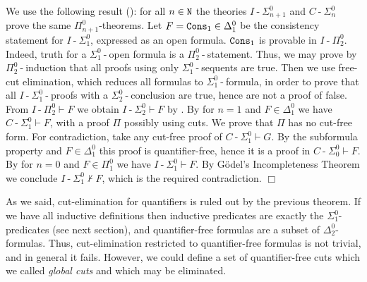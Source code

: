\documentclass[a4paper,12pt]{article}
\newenvironment{proof}[1][Proof]{\begin{trivlist}
\item[\hskip \labelsep {\bfseries #1}]}{\end{trivlist}}
\newcommand{\Nat}               { {\tt N}  }
\newcommand{\Cons}            { {\tt Cons} }
\newcommand{\hy}        { {\operatorname{-}}}
\begin{document}
\begin{proof}
We use the following result (\cite{Anupam}): for all $n \in \Nat$ the theories $I\hy \Sigma^0_{n+1}$ and $C\hy \Sigma^0_{n}$ prove the same $\Pi^0_{n+1}$-theorems. Let $F = \Cons_1 \in \Delta^0_1$ be the consistency statement for  $I\hy \Sigma^0_1$, expressed as an open formula. $\Cons_1$ is provable in $I\hy \Pi^0_2$.  Indeed, truth for a $\Sigma^0_1\hy $open formula is a $\Pi^0_2\hy $statement. Thus, we may prove by $\Pi^0_2\hy $induction that all proofs using only $\Sigma^0_1\hy $sequents are true. Then we use free-cut elimination, which reduces all formulas to $\Sigma^0_1\hy $formula, in order to prove that all $I\hy \Sigma^0_1\hy $proofs with a $\Sigma^0_2\hy $conclusion are true, hence are not a proof of false.  From $I\hy \Pi^0_2 \vdash F$ we obtain $I\hy \Sigma^0_2 \vdash F$ by \cite{Buss}. By \cite{Anupam} for $n=1$ and $F \in \Delta^0_1$ we have $C\hy \Sigma^0_1 \vdash F$, with a proof $\Pi$ possibly using cuts. We prove that $\Pi$ has no cut-free form. For contradiction, take any cut-free proof of $C\hy \Sigma^0_1 \vdash G$. By the subformula property and $F \in \Delta^0_1$ this proof is quantifier-free, hence it is a proof in $C\hy \Sigma^0_0 \vdash F$. By  \cite{Anupam} for $n=0$ and $F \in \Pi^0_1$ we have $I\hy \Sigma^0_1 \vdash F$. By G\"{o}del's Incompleteness Theorem we conclude $I\hy \Sigma^0_1 \not \vdash F$, which is the required contradiction. 
$\Box$ \end{proof}



As we said, cut-elimination for quantifiers is ruled out by the previous theorem. If we have all inductive definitions then inductive predicates are exactly the $\Sigma^0_1$-predicates (see next section), and quantifier-free formulas are a subset of $\Delta^0_2$-formulas. Thus, cut-elimination restricted to quantifier-free formulas is not trivial, and in general it fails. However, we could define a set of quantifier-free cuts which we called \emph{global cuts} and which may be eliminated. 
\end{document}
